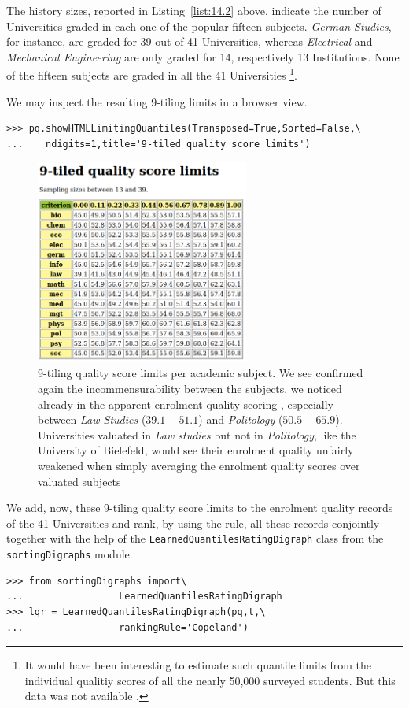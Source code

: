 The history sizes, reported in Listing~\vref{list:14.2} above, indicate the number of Universities graded in each one of the popular fifteen subjects. \emph{German Studies}, for instance, are graded for 39 out of 41 Universities, whereas \emph{Electrical} and \emph{Mechanical Engineering} are only graded for 14, respectively 13 Institutions. None of the fifteen subjects are graded in all the 41 Universities \footnote{It would have been interesting to estimate such quantile limits from the individual qualitiy scores of all the nearly 50,000 surveyed students. But this data was not available \citep{SPI-2004}.}. 

We may inspect the resulting 9-tiling limits in a browser view.
\begin{lstlisting}
>>> pq.showHTMLLimitingQuantiles(Transposed=True,Sorted=False,\
...	   ndigits=1,title='9-tiled quality score limits')
\end{lstlisting}

\begin{figure}[h]
\sidecaption[t]
\includegraphics[width=7cm]{Figures/14-3-score9Limits.png}
\caption{9-tiling quality score limits per academic subject. We see confirmed again the incommensurability between the subjects, we noticed already in the apparent enrolment quality scoring , especially between \emph{Law Studies} ($39.1 - 51.1$) and \emph{Politology} ($50.5 - 65.9$). Universities valuated in \emph{Law studies} but not in \emph{Politology}, like the University of Bielefeld, would see their enrolment quality unfairly weakened when simply averaging the enrolment quality scores over valuated subjects}
\label{fig:14.3}       %
\end{figure}
We add, now, these 9-tiling quality score limits to the enrolment quality records of the 41 Universities and rank, by using the \Copeland rule, all these records conjointly together with the help of the \texttt{LearnedQuantilesRatingDigraph} class from the \texttt{sortingDigraphs} module.
\begin{lstlisting}
>>> from sortingDigraphs import\
...                 LearnedQuantilesRatingDigraph
>>> lqr = LearnedQuantilesRatingDigraph(pq,t,\
...                 rankingRule='Copeland')
\end{lstlisting}

